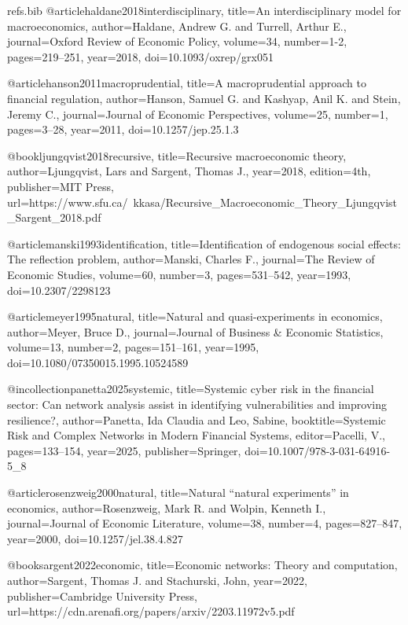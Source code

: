 \begin{filecontents}[overwrite]{refs.bib}
@article{haldane2018interdisciplinary,
  title={An interdisciplinary model for macroeconomics},
  author={Haldane, Andrew G. and Turrell, Arthur E.},
  journal={Oxford Review of Economic Policy},
  volume={34},
  number={1-2},
  pages={219--251},
  year={2018},
  doi={10.1093/oxrep/grx051}
}

@article{hanson2011macroprudential,
  title={A macroprudential approach to financial regulation},
  author={Hanson, Samuel G. and Kashyap, Anil K. and Stein, Jeremy C.},
  journal={Journal of Economic Perspectives},
  volume={25},
  number={1},
  pages={3--28},
  year={2011},
  doi={10.1257/jep.25.1.3}
}

@book{ljungqvist2018recursive,
  title={Recursive macroeconomic theory},
  author={Ljungqvist, Lars and Sargent, Thomas J.},
  year={2018},
  edition={4th},
  publisher={MIT Press},
  url={https://www.sfu.ca/~kkasa/Recursive_Macroeconomic_Theory_Ljungqvist_Sargent_2018.pdf}
}

@article{manski1993identification,
  title={Identification of endogenous social effects: The reflection problem},
  author={Manski, Charles F.},
  journal={The Review of Economic Studies},
  volume={60},
  number={3},
  pages={531--542},
  year={1993},
  doi={10.2307/2298123}
}

@article{meyer1995natural,
  title={Natural and quasi-experiments in economics},
  author={Meyer, Bruce D.},
  journal={Journal of Business \& Economic Statistics},
  volume={13},
  number={2},
  pages={151--161},
  year={1995},
  doi={10.1080/07350015.1995.10524589}
}

@incollection{panetta2025systemic,
  title={Systemic cyber risk in the financial sector: Can network analysis assist in identifying vulnerabilities and improving resilience?},
  author={Panetta, Ida Claudia and Leo, Sabine},
  booktitle={Systemic Risk and Complex Networks in Modern Financial Systems},
  editor={Pacelli, V.},
  pages={133--154},
  year={2025},
  publisher={Springer},
  doi={10.1007/978-3-031-64916-5_8}
}

@article{rosenzweig2000natural,
  title={Natural {``natural experiments''} in economics},
  author={Rosenzweig, Mark R. and Wolpin, Kenneth I.},
  journal={Journal of Economic Literature},
  volume={38},
  number={4},
  pages={827--847},
  year={2000},
  doi={10.1257/jel.38.4.827}
}

@book{sargent2022economic,
  title={Economic networks: Theory and computation},
  author={Sargent, Thomas J. and Stachurski, John},
  year={2022},
  publisher={Cambridge University Press},
  url={https://cdn.arenafi.org/papers/arxiv/2203.11972v5.pdf}
}


\end{filecontents}
